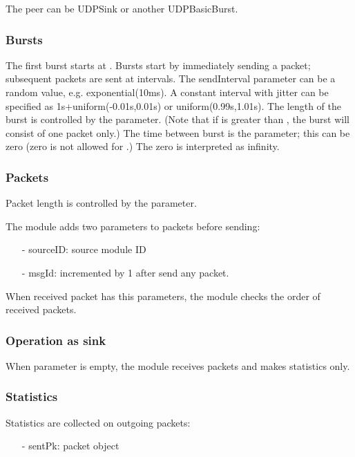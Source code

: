 The peer can be UDPSink or another UDPBasicBurst.

\subsubsection*{Bursts}

The first burst starts at . Bursts start by immediately sending
a packet; subsequent packets are sent at  intervals. The
sendInterval parameter can be a random value, e.g. exponential(10ms).
A constant interval with jitter can be specified as 1s+uniform(-0.01s,0.01s)
or uniform(0.99s,1.01s). The length of the burst is controlled by the
 parameter. (Note that if  is greater than
, the burst will consist of one packet only.) The time between
burst is the  parameter; this can be zero (zero is not
allowed for .) The zero  is interpreted as infinity.

\subsubsection*{Packets}

Packet length is controlled by the  parameter.

The module adds two parameters to packets before sending:
\begin{itemize}
\item[-] sourceID: source module ID
\item[-] msgId: incremented by 1 after send any packet.
\end{itemize}
When received packet has this parameters, the module checks the order of received packets.

\subsubsection*{Operation as sink}

When  parameter is empty, the module receives packets and makes statistics only.

\subsubsection*{Statistics}

Statistics are collected on outgoing packets:
\begin{itemize}
\item[-] sentPk: packet object
\end{itemize}

